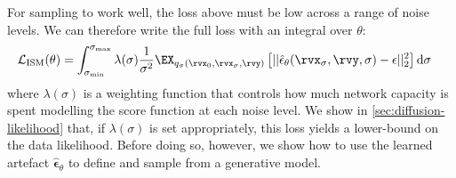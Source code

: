 For sampling to work well, the loss above must be low across a range of noise levels. We can therefore write the full loss with an integral over $\theta$:
\begin{align} \label{eq:diffusion-loss-all-sigma}
    \mathcal{L}_\text{ISM}(\theta) &= \int_{\sigma_\text{min}}^{\sigma_\text{max}} \lambda(\sigma) \frac{1}{\sigma^2} \EX_{q_{\sigma}(\rvx_0, \rvx_\sigma, \rvy)} \left[ 
    || \hat{\mathbf{\epsilon}}_\theta(\rvx_\sigma, \rvy, \sigma) - \epsilon ||_2^2 \right] \mathrm{d}\sigma
\end{align}
where $\lambda(\sigma)$ is a weighting function that controls how much network capacity is spent modelling the score function at each noise level. We show in \cref{sec:diffusion-likelihood} that, if $\lambda(\sigma)$ is set appropriately, this loss yields a lower-bound on the data likelihood. Before doing so, however, we show how to use the learned artefact $\hat{\mathbf{\epsilon}}_\theta$ to define and sample from a generative model.


